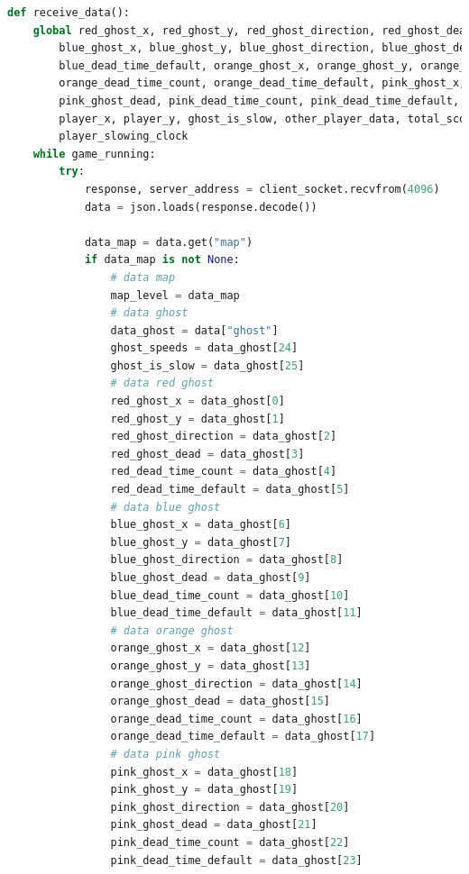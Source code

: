 \documentclass[a4paper]{article}
\begin{document}
\begin{lstlisting}[language=Python]
def receive_data():
    global red_ghost_x, red_ghost_y, red_ghost_direction, red_ghost_dead, red_dead_time_count, red_dead_time_default, \
        blue_ghost_x, blue_ghost_y, blue_ghost_direction, blue_ghost_dead, blue_dead_time_count, \
        blue_dead_time_default, orange_ghost_x, orange_ghost_y, orange_ghost_direction, orange_ghost_dead, \
        orange_dead_time_count, orange_dead_time_default, pink_ghost_x, pink_ghost_y, pink_ghost_direction, \
        pink_ghost_dead, pink_dead_time_count, pink_dead_time_default, ghost_speeds, map_level, player_dead, \
        player_x, player_y, ghost_is_slow, other_player_data, total_score, data_score_table, player_slowing, \
        player_slowing_clock
    while game_running:
        try:
            response, server_address = client_socket.recvfrom(4096)
            data = json.loads(response.decode())

            data_map = data.get("map")
            if data_map is not None:
                # data map
                map_level = data_map
                # data ghost
                data_ghost = data["ghost"]
                ghost_speeds = data_ghost[24]
                ghost_is_slow = data_ghost[25]
                # data red ghost
                red_ghost_x = data_ghost[0]
                red_ghost_y = data_ghost[1]
                red_ghost_direction = data_ghost[2]
                red_ghost_dead = data_ghost[3]
                red_dead_time_count = data_ghost[4]
                red_dead_time_default = data_ghost[5]
                # data blue ghost
                blue_ghost_x = data_ghost[6]
                blue_ghost_y = data_ghost[7]
                blue_ghost_direction = data_ghost[8]
                blue_ghost_dead = data_ghost[9]
                blue_dead_time_count = data_ghost[10]
                blue_dead_time_default = data_ghost[11]
                # data orange ghost
                orange_ghost_x = data_ghost[12]
                orange_ghost_y = data_ghost[13]
                orange_ghost_direction = data_ghost[14]
                orange_ghost_dead = data_ghost[15]
                orange_dead_time_count = data_ghost[16]
                orange_dead_time_default = data_ghost[17]
                # data pink ghost
                pink_ghost_x = data_ghost[18]
                pink_ghost_y = data_ghost[19]
                pink_ghost_direction = data_ghost[20]
                pink_ghost_dead = data_ghost[21]
                pink_dead_time_count = data_ghost[22]
                pink_dead_time_default = data_ghost[23]


\end{lstlisting}
\end{document}
